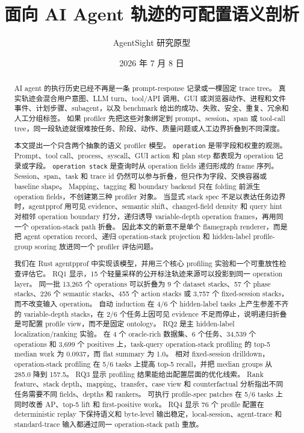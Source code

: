 \documentclass[10pt,twocolumn]{ctexart}
\title{\vspace{-1.2em}面向 AI Agent 轨迹的可配置语义剖析}
\author{AgentSight 研究原型}
\date{2026 年 7 月 8 日}
\newcommand{\toolname}{agentpprof}
\newcommand{\op}{\texttt{operation}}
\newcommand{\opstack}{\texttt{operation stack}}
\begin{document}
\maketitle
\vspace{-1.4em}

\begin{abstract}
AI agent 的执行历史已经不再是一条 prompt-response 记录或一棵固定 trace tree。
真实轨迹会混合用户意图、LLM turn、tool/API 调用、GUI 或浏览器动作、进程和文件事件、计划步骤、subagent，以及 benchmark 给出的成功、失败、安全、重复、冗余和人工分组标签。
如果 profiler 先把这些对象绑定到 prompt、session、span 或 tool-call tree，同一段轨迹就很难按任务、阶段、动作、质量问题或人工边界折叠到不同深度。

本文提出一个只含两个抽象的语义 profiler 模型。
\op{} 是带字段和权重的观测。
Prompt、tool call、process、syscall、GUI action 和 plan step 都表现为 operation 记录或字段。
\opstack{} 是查询时从 operation fields 递归形成的 frame 序列。
Session、span、task 和 trace id 仍然可以参与折叠，但只作为字段、交换容器或 baseline shape。
Mapping、tagging 和 boundary backend 只在 folding 前派生 operation fields，不创建第三种 profiler 对象。
当显式 stack spec 不足以表达任务边界时，\toolname{} 用可见 evidence、semantic shift、changed-field density 和 query hint 对相邻 operation boundary 打分，递归诱导 variable-depth operation frames，再用同一个 operation-stack path 折叠。
因此本文的新意不是单个 flamegraph renderer，而是把 agent operation record、递归 operation-stack projection 和 hidden-label profile-group scoring 放进同一个 profiler 评估问题。

我们在 Rust \toolname{} 中实现该模型，并用三个核心 profiling 实验和一个可重放性检查评估它。
RQ1 显示，15 个轻量采样的公开标注轨迹来源可以投影到同一 operation layer。
同一批 13,265 个 operations 可以折叠为 9 个 dataset stacks、57 个 phase stacks、226 个 semantic stacks、455 个 action stacks 或 3,757 个 fixed-session stacks，而不改变输入 operation。
自动 induction 在 4/6 个 hidden-label tasks 上产生参差不齐的 variable-depth stacks，在 2/6 个任务上因可见 evidence 不足而停止，说明递归折叠是可配置 profile view，而不是固定 ontology。
RQ2 是主 hidden-label localization/ranking 实验。
在 4 个 oracle-rich 数据集、6 个任务、34,539 个 operations 和 3,699 个 positives 上，task-query operation-stack profiling 的 top-5 median work 为 0.0937，而 flat summary 为 1.0。
相对 fixed-session drilldown，operation-stack profiling 在 5/6 tasks 上提高 top-5 recall，并把 median groups 从 285.0 降到 157.5。
RQ3 显示 profiling 结果能给出配置层面的优化线索。
Rank feature、stack depth、mapping、transfer、case view 和 counterfactual 分析指出不同任务需要不同 fields、depths 和 rankers。
可执行 profile-spec patches 在 5/6 tasks 上同时改善 AP、top-5 lift 和 first-positive work。
RQ4 显示 76 个 profile 配置在 deterministic replay 下保持语义和 byte-level 输出稳定，local-session、agent-trace 和 standard-trace 输入都通过同一 operation-stack path 重放。


\end{abstract}
\end{document}

